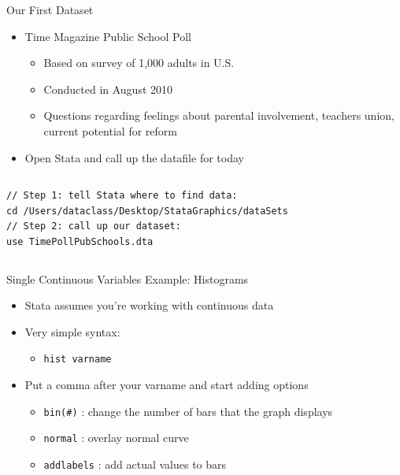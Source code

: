 \documentclass[table,smaller]{beamer}
\begin{document}
\begin{frame}[fragile,label=sec-2-1]{Our First Dataset}
 \begin{itemize}
\item Time Magazine Public School Poll
\begin{itemize}
\item Based on survey of 1,000 adults in U.S.
\item Conducted in August 2010
\item Questions regarding feelings about parental involvement, teachers union, current potential for reform
\end{itemize}

\item Open Stata and call up the datafile for today
\end{itemize}

\vspace{-.5em} \begin{columns}  \begin{block}{}
\begin{verbatim}
// Step 1: tell Stata where to find data:
cd /Users/dataclass/Desktop/StataGraphics/dataSets
// Step 2: call up our dataset:
use TimePollPubSchools.dta
\end{verbatim}
\end{block} \end{columns}
\end{frame}

\begin{frame}[fragile,label=sec-2-2]{Single Continuous Variables}
 Example: Histograms
\begin{itemize}
\item Stata assumes you’re working with continuous data
\item Very simple syntax: 
\begin{itemize}
\item \texttt{hist varname}
\end{itemize}
\item Put a comma after your varname and start adding options
\begin{itemize}
\item \texttt{bin(\#)} : change the number of bars that the graph displays
\item \texttt{normal} : overlay normal curve
\item \texttt{addlabels} : add actual values to bars
\end{itemize}
\end{itemize}
\end{frame}
\end{document}
